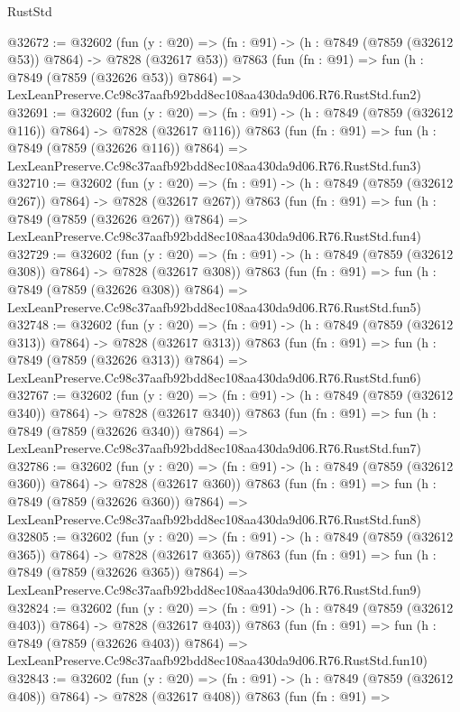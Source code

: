 \begin{lexlean}{RustStd}
\begin{coremodule}
@32672 := @32602
    (fun (y : @20) => (fn : @91) -> (h : @7849 (@7859 (@32612 @53)) @7864) -> @7828 (@32617 @53))
    @7863
    (fun (fn : @91) =>
    fun (h : @7849 (@7859 (@32626 @53)) @7864) =>
    LexLeanPreserve.Cc98c37aafb92bdd8ec108aa430da9d06.R76.RustStd.fun2)
@32691 := @32602
    (fun (y : @20) => (fn : @91) -> (h : @7849 (@7859 (@32612 @116)) @7864) -> @7828 (@32617 @116))
    @7863
    (fun (fn : @91) =>
    fun (h : @7849 (@7859 (@32626 @116)) @7864) =>
    LexLeanPreserve.Cc98c37aafb92bdd8ec108aa430da9d06.R76.RustStd.fun3)
@32710 := @32602
    (fun (y : @20) => (fn : @91) -> (h : @7849 (@7859 (@32612 @267)) @7864) -> @7828 (@32617 @267))
    @7863
    (fun (fn : @91) =>
    fun (h : @7849 (@7859 (@32626 @267)) @7864) =>
    LexLeanPreserve.Cc98c37aafb92bdd8ec108aa430da9d06.R76.RustStd.fun4)
@32729 := @32602
    (fun (y : @20) => (fn : @91) -> (h : @7849 (@7859 (@32612 @308)) @7864) -> @7828 (@32617 @308))
    @7863
    (fun (fn : @91) =>
    fun (h : @7849 (@7859 (@32626 @308)) @7864) =>
    LexLeanPreserve.Cc98c37aafb92bdd8ec108aa430da9d06.R76.RustStd.fun5)
@32748 := @32602
    (fun (y : @20) => (fn : @91) -> (h : @7849 (@7859 (@32612 @313)) @7864) -> @7828 (@32617 @313))
    @7863
    (fun (fn : @91) =>
    fun (h : @7849 (@7859 (@32626 @313)) @7864) =>
    LexLeanPreserve.Cc98c37aafb92bdd8ec108aa430da9d06.R76.RustStd.fun6)
@32767 := @32602
    (fun (y : @20) => (fn : @91) -> (h : @7849 (@7859 (@32612 @340)) @7864) -> @7828 (@32617 @340))
    @7863
    (fun (fn : @91) =>
    fun (h : @7849 (@7859 (@32626 @340)) @7864) =>
    LexLeanPreserve.Cc98c37aafb92bdd8ec108aa430da9d06.R76.RustStd.fun7)
@32786 := @32602
    (fun (y : @20) => (fn : @91) -> (h : @7849 (@7859 (@32612 @360)) @7864) -> @7828 (@32617 @360))
    @7863
    (fun (fn : @91) =>
    fun (h : @7849 (@7859 (@32626 @360)) @7864) =>
    LexLeanPreserve.Cc98c37aafb92bdd8ec108aa430da9d06.R76.RustStd.fun8)
@32805 := @32602
    (fun (y : @20) => (fn : @91) -> (h : @7849 (@7859 (@32612 @365)) @7864) -> @7828 (@32617 @365))
    @7863
    (fun (fn : @91) =>
    fun (h : @7849 (@7859 (@32626 @365)) @7864) =>
    LexLeanPreserve.Cc98c37aafb92bdd8ec108aa430da9d06.R76.RustStd.fun9)
@32824 := @32602
    (fun (y : @20) => (fn : @91) -> (h : @7849 (@7859 (@32612 @403)) @7864) -> @7828 (@32617 @403))
    @7863
    (fun (fn : @91) =>
    fun (h : @7849 (@7859 (@32626 @403)) @7864) =>
    LexLeanPreserve.Cc98c37aafb92bdd8ec108aa430da9d06.R76.RustStd.fun10)
@32843 := @32602
    (fun (y : @20) => (fn : @91) -> (h : @7849 (@7859 (@32612 @408)) @7864) -> @7828 (@32617 @408))
    @7863
    (fun (fn : @91) =>

\end{coremodule}
\end{lexlean}
